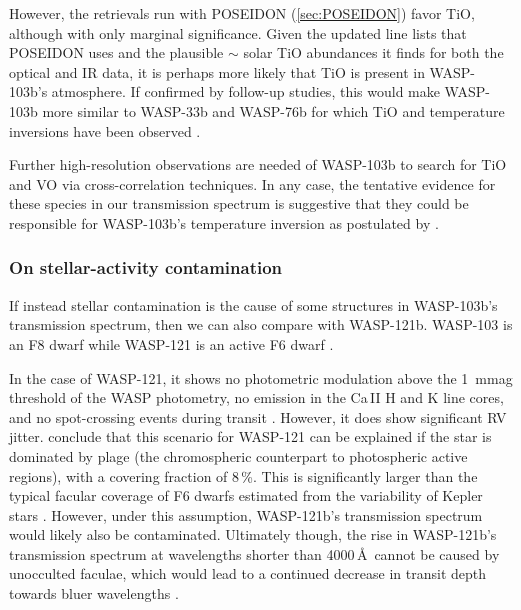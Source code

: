 \documentclass[twocolumn]{aastex63}
\begin{document}
However, the retrievals run with POSEIDON (\autoref{sec:POSEIDON}) favor TiO, although with only marginal significance. Given the updated line lists that POSEIDON uses and the plausible $\sim$ solar TiO abundances it finds for both the optical and IR data, it is perhaps more likely that TiO is present in WASP-103b's atmosphere. If confirmed by follow-up studies, this would make WASP-103b more similar to WASP-33b and WASP-76b for which TiO and temperature inversions have been observed \citep{Haynes2015,Nugroho2017,Fu2020}.

Further high-resolution observations are needed of WASP-103b to search for TiO and VO via cross-correlation techniques. In any case, the tentative evidence for these species in our transmission spectrum is suggestive that they could be responsible for WASP-103b's temperature inversion as postulated by \cite{Kreidberg2018}.

\subsubsection{On stellar-activity contamination}

If instead stellar contamination is the cause of some structures in WASP-103b's transmission spectrum, then we can also compare with WASP-121b. WASP-103 is an F8 dwarf \citep{Gillon2014} while WASP-121 is an active F6 dwarf \citep{Delrez2016}. 

In the case of WASP-121, it shows no photometric modulation above the 1~mmag threshold of the WASP photometry, no emission in the Ca\,{\footnotesize II} H and K line cores, and no spot-crossing events during transit \citep{Delrez2016}. However, it does show significant RV jitter. \cite{Delrez2016} conclude that this scenario for WASP-121 can be explained if the star is dominated by plage (the chromospheric counterpart to photospheric active regions), with a covering fraction of 8\,\%. This is significantly larger than the typical facular coverage of F6 dwarfs estimated from the variability of Kepler stars \citep{Rackham2019}. However, under this assumption, WASP-121b's transmission spectrum would likely also be contaminated. Ultimately though, the rise in WASP-121b's transmission spectrum at wavelengths shorter than 4000\,\AA\ cannot be caused by unocculted faculae, which would lead to a continued decrease in transit depth towards bluer wavelengths \citep[e.g.,][]{Rackham2017,Rackham2019}.
\end{document}
